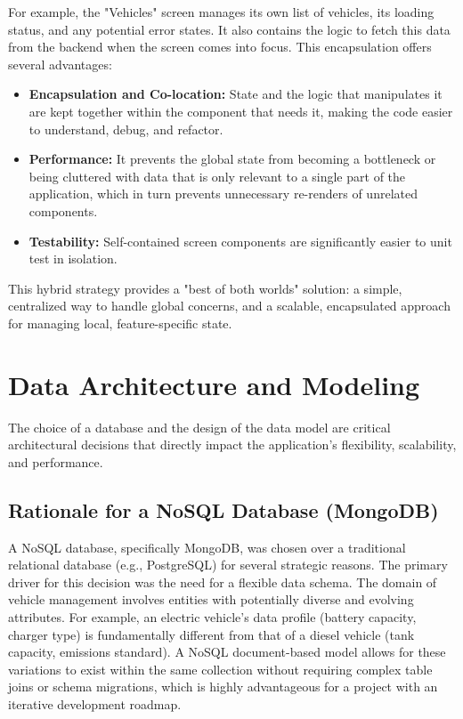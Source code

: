 \textgap

For example, the "Vehicles" screen manages its own list of vehicles, its loading status, and any potential error states. It also contains the logic to fetch this data from the backend when the screen comes into focus. This encapsulation offers several advantages:
\begin{itemize}
    \item \textbf{Encapsulation and Co-location:} State and the logic that manipulates it are kept together within the component that needs it, making the code easier to understand, debug, and refactor.
    \item \textbf{Performance:} It prevents the global state from becoming a bottleneck or being cluttered with data that is only relevant to a single part of the application, which in turn prevents unnecessary re-renders of unrelated components.
    \item \textbf{Testability:} Self-contained screen components are significantly easier to unit test in isolation.
\end{itemize}
This hybrid strategy provides a "best of both worlds" solution: a simple, centralized way to handle global concerns, and a scalable, encapsulated approach for managing local, feature-specific state.

\section{Data Architecture and Modeling}

The choice of a database and the design of the data model are critical architectural decisions that directly impact the application's flexibility, scalability, and performance.

\subsection{Rationale for a NoSQL Database (MongoDB)}
A NoSQL database, specifically MongoDB, was chosen over a traditional relational database (e.g., PostgreSQL) for several strategic reasons. The primary driver for this decision was the need for a flexible data schema. The domain of vehicle management involves entities with potentially diverse and evolving attributes. For example, an electric vehicle's data profile (battery capacity, charger type) is fundamentally different from that of a diesel vehicle (tank capacity, emissions standard). A NoSQL document-based model allows for these variations to exist within the same collection without requiring complex table joins or schema migrations, which is highly advantageous for a project with an iterative development roadmap.

